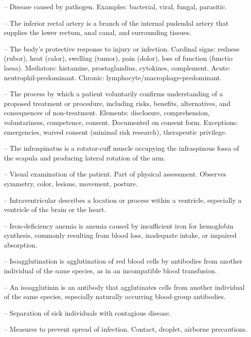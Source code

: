 -- Disease caused by pathogen. Examples: bacterial, viral, fungal, parasitic.

-- The inferior rectal artery is a branch of the internal pudendal artery that supplies the lower rectum, anal canal, and surrounding tissues.

-- The body's protective response to injury or infection. Cardinal signs: redness (rubor), heat (calor), swelling (tumor), pain (dolor), loss of function (functio laesa). Mediators: histamine, prostaglandins, cytokines, complement. Acute: neutrophil-predominant. Chronic: lymphocyte/macrophage-predominant.

-- The process by which a patient voluntarily confirms understanding of a proposed treatment or procedure, including risks, benefits, alternatives, and consequences of non-treatment. Elements: disclosure, comprehension, voluntariness, competence, consent. Documented on consent form. Exceptions: emergencies, waived consent (minimal risk research), therapeutic privilege.

-- The infraspinatus is a rotator-cuff muscle occupying the infraspinous fossa of the scapula and producing lateral rotation of the arm.

-- Visual examination of the patient. Part of physical assessment. Observes symmetry, color, lesions, movement, posture.

-- Intraventricular describes a location or process within a ventricle, especially a ventricle of the brain or the heart.

-- Iron-deficiency anemia is anemia caused by insufficient iron for hemoglobin synthesis, commonly resulting from blood loss, inadequate intake, or impaired absorption.

-- Isoagglutination is agglutination of red blood cells by antibodies from another individual of the same species, as in an incompatible blood transfusion.

-- An isoagglutinin is an antibody that agglutinates cells from another individual of the same species, especially naturally occurring blood-group antibodies.

-- Separation of sick individuals with contagious disease.

-- Measures to prevent spread of infection. Contact, droplet, airborne precautions.

